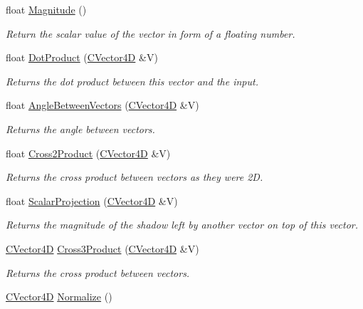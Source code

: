 \begin{DoxyCompactItemize}
\item 
float \hyperlink{struct_c_vector4_d_adca194252431e3ad20fe2f9eb3d50c94}{Magnitude} ()
\begin{DoxyCompactList}\small\item\em Return the scalar value of the vector in form of a floating number. \end{DoxyCompactList}\item 
float \hyperlink{struct_c_vector4_d_a5275a3ca061456204f993e0218e1da3d}{Dot\+Product} (\hyperlink{struct_c_vector4_d}{C\+Vector4D} \&V)
\begin{DoxyCompactList}\small\item\em Returns the dot product between this vector and the input. \end{DoxyCompactList}\item 
float \hyperlink{struct_c_vector4_d_a321c596c1efdbbc9bc27fe5b73ef1f2a}{Angle\+Between\+Vectors} (\hyperlink{struct_c_vector4_d}{C\+Vector4D} \&V)
\begin{DoxyCompactList}\small\item\em Returns the angle between vectors. \end{DoxyCompactList}\item 
float \hyperlink{struct_c_vector4_d_a14728590b324cc788d13745fcadb1eb3}{Cross2\+Product} (\hyperlink{struct_c_vector4_d}{C\+Vector4D} \&V)
\begin{DoxyCompactList}\small\item\em Returns the cross product between vectors as they were 2D. \end{DoxyCompactList}\item 
float \hyperlink{struct_c_vector4_d_ad704d379cb1e8f1994e1495e5dd8b9d6}{Scalar\+Projection} (\hyperlink{struct_c_vector4_d}{C\+Vector4D} \&V)
\begin{DoxyCompactList}\small\item\em Returns the magnitude of the shadow left by another vector on top of this vector. \end{DoxyCompactList}\item 
\hyperlink{struct_c_vector4_d}{C\+Vector4D} \hyperlink{struct_c_vector4_d_a06dca3da2073f693aa512402ec52d42d}{Cross3\+Product} (\hyperlink{struct_c_vector4_d}{C\+Vector4D} \&V)
\begin{DoxyCompactList}\small\item\em Returns the cross product between vectors. \end{DoxyCompactList}\item 
\hyperlink{struct_c_vector4_d}{C\+Vector4D} \hyperlink{struct_c_vector4_d_acd8e31716990aa44448b44a4eff39917}{Normalize} ()

\end{DoxyCompactItemize}
